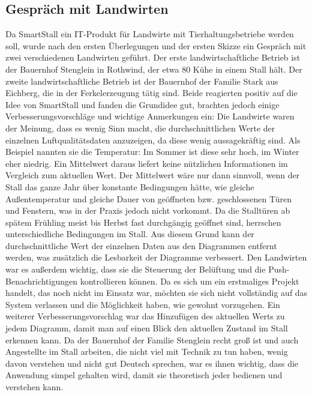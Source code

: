 \documentclass[conference]{IEEEtran}
\begin{document}
\subsection{Gespräch mit Landwirten}
Da SmartStall ein IT-Produkt für Landwirte mit Tierhaltungsbetriebe werden soll, wurde nach den ersten Überlegungen und der ersten Skizze ein Gespräch mit zwei verschiedenen Landwirten geführt. Der erste landwirtschaftliche Betrieb ist der Bauernhof Stenglein in Rothwind, der etwa 80 Kühe in einem Stall hält. Der zweite landwirtschaftliche Betrieb ist der Bauernhof der Familie Stark aus Eichberg, die in der Ferkelerzeugung tätig sind. Beide reagierten positiv auf die Idee von SmartStall und fanden die Grundidee gut, brachten jedoch einige Verbesserungsvorschläge und wichtige Anmerkungen ein:
Die Landwirte waren der Meinung, dass es wenig Sinn macht, die durchschnittlichen Werte der einzelnen Luftqualitätsdaten anzuzeigen, da diese wenig aussagekräftig sind. Als Beispiel nannten sie die Temperatur: Im Sommer ist diese sehr hoch, im Winter eher niedrig. Ein Mittelwert daraus liefert keine nützlichen Informationen im Vergleich zum aktuellen Wert. Der Mittelwert wäre nur dann sinnvoll, wenn der Stall das ganze Jahr über konstante Bedingungen hätte, wie gleiche Außentemperatur und gleiche Dauer von geöffneten bzw. geschlossenen Türen und Fenstern, was in der Praxis jedoch nicht vorkommt. Da die Stalltüren ab spätem Frühling meist bis Herbst fast durchgängig geöffnet sind, herrschen unterschiedliche Bedingungen im Stall. Aus diesem Grund kann der durchschnittliche Wert der einzelnen Daten aus den Diagrammen entfernt werden, was zusätzlich die Lesbarkeit der Diagramme verbessert.
Den Landwirten war es außerdem wichtig, dass sie die Steuerung der Belüftung und die Push-Benachrichtigungen kontrollieren können. Da es sich um ein erstmaliges Projekt handelt, das noch nicht im Einsatz war, möchten sie sich nicht vollständig auf das System verlassen und die Möglichkeit haben, wie gewohnt vorzugehen.
Ein weiterer Verbesserungsvorschlag war das Hinzufügen des aktuellen Werts zu jedem Diagramm, damit man auf einen Blick den aktuellen Zustand im Stall erkennen kann.
Da der Bauernhof der Familie Stenglein recht groß ist und auch Angestellte im Stall arbeiten, die nicht viel mit Technik zu tun haben, wenig davon verstehen und nicht gut Deutsch sprechen, war es ihnen wichtig, dass die Anwendung simpel gehalten wird, damit sie theoretisch jeder bedienen und verstehen kann.
\end{document}
